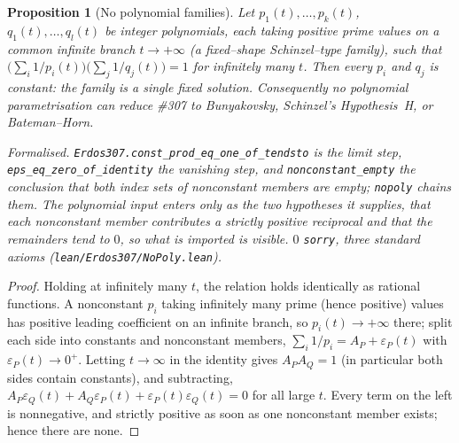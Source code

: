 \documentclass[11pt]{article}
\newtheorem{proposition}[theorem]{Proposition}
\theoremstyle{definition}
\begin{document}
\begin{proposition}[No polynomial families]\label{prop:nopoly}
Let $p_1(t),\dots,p_k(t)$, $q_1(t),\dots,q_l(t)$ be integer polynomials, each taking \emph{positive}
prime values on a common infinite branch $t\to+\infty$ (a fixed--shape Schinzel--type family), such
that
$\bigl(\sum_i1/p_i(t)\bigr)\bigl(\sum_j1/q_j(t)\bigr)=1$ for infinitely many $t$. Then every $p_i$ and
$q_j$ is constant: the family is a single fixed solution. Consequently no polynomial parametrisation can
reduce \#307 to Bunyakovsky, Schinzel's Hypothesis~H, or Bateman--Horn.

\textup{Formalised.} \texttt{Erdos307.const\_prod\_eq\_one\_of\_tendsto} is the limit step,
\texttt{eps\_eq\_zero\_of\_identity} the vanishing step, and \texttt{nonconstant\_empty} the
conclusion that both index sets of nonconstant members are empty; \texttt{nopoly} chains them. The
polynomial input enters only as the two hypotheses it supplies, that each nonconstant member
contributes a strictly positive reciprocal and that the remainders tend to $0$, so what is imported
is visible. $0$ \texttt{sorry}, three standard axioms
\textup{(\texttt{lean/Erdos307/NoPoly.lean})}.
\end{proposition}
\begin{proof}
Holding at infinitely many $t$, the relation holds identically as rational functions. A nonconstant
$p_i$ taking infinitely many prime (hence positive) values has positive leading coefficient on an
infinite branch, so $p_i(t)\to+\infty$ there; split each side into constants and nonconstant members,
$\sum_i1/p_i=A_P+\varepsilon_P(t)$ with $\varepsilon_P(t)\to0^+$. Letting $t\to\infty$ in the identity
gives $A_PA_Q=1$ (in particular both sides contain constants), and subtracting,
$A_P\varepsilon_Q(t)+A_Q\varepsilon_P(t)+\varepsilon_P(t)\varepsilon_Q(t)=0$ for all large $t$. Every
term on the left is nonnegative, and strictly positive as soon as one nonconstant member exists; hence
there are none.
\end{proof}
\end{document}
